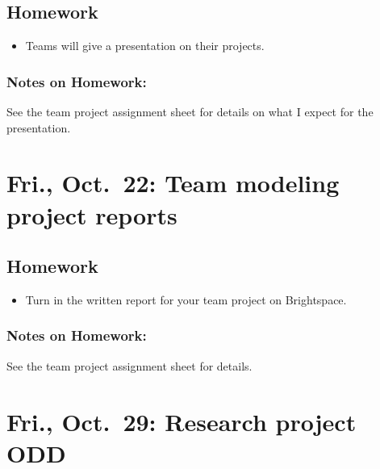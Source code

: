 \documentclass[
]{article}
\providecommand{\tightlist}{%
  \setlength{\itemsep}{0pt}\setlength{\parskip}{0pt}}
\begin{document}
\hypertarget{homework-11}{%
\subsection{Homework}\label{homework-11}}

\begin{itemize}
\tightlist
\item
  Teams will give a presentation on their projects.
\end{itemize}

\hypertarget{notes-on-homework-7}{%
\subsubsection{Notes on Homework:}\label{notes-on-homework-7}}

See the team project assignment sheet for details on what I expect for
the presentation.

\hypertarget{fri.-oct.-22-team-modeling-project-reports}{%
\section{Fri., Oct.~22: Team modeling project
reports}\label{fri.-oct.-22-team-modeling-project-reports}}

\hypertarget{homework-12}{%
\subsection{Homework}\label{homework-12}}

\begin{itemize}
\tightlist
\item
  Turn in the written report for your team project on Brightspace.
\end{itemize}

\hypertarget{notes-on-homework-8}{%
\subsubsection{Notes on Homework:}\label{notes-on-homework-8}}

See the team project assignment sheet for details.

\hypertarget{fri.-oct.-29-research-project-odd}{%
\section{Fri., Oct.~29: Research project
ODD}\label{fri.-oct.-29-research-project-odd}}
\end{document}
